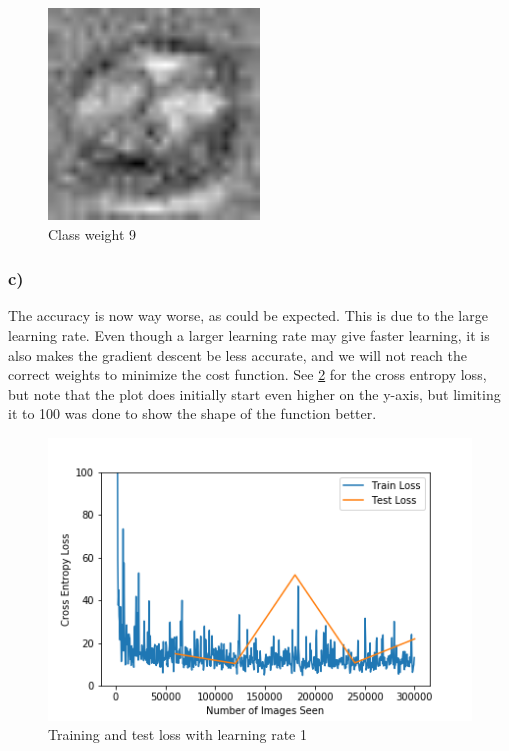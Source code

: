 \begin{figure}[]
    \centering
    \includegraphics[width=0.50\textwidth]{figures/weights/class_9_weight_image.jpg}
    \caption{Class weight 9}
    \label{fig:class_weight_9}
\end{figure}

\subsubsection*{c)}
The accuracy is now way worse, as could be expected. This is due to the large learning rate. Even though a larger learning rate may give faster learning, it is also makes the gradient descent be less accurate, and we will not reach the correct weights to minimize the cost function. See \cref{fig:training_loss_learning_rate_1} for the cross entropy loss, but note that the plot does initially start even higher on the y-axis, but limiting it to 100 was done to show the shape of the function better. 

\begin{figure}[]
    \centering
    \includegraphics[width=1.00\textwidth]{figures/training/bad_learning_rate_training_loss.png}
    \caption{Training and test loss with learning rate 1}
    \label{fig:training_loss_learning_rate_1}
\end{figure}

